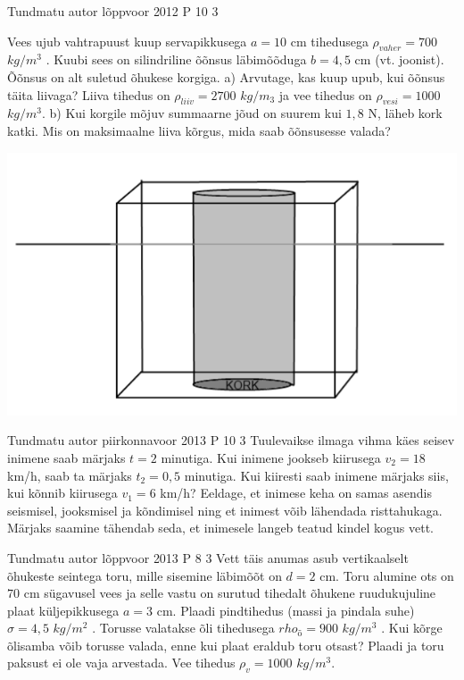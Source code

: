 \documentclass[11pt]{article}
\begin{document}
{%
{Tundmatu autor} %
{lõppvoor} %
{2012} %
{P 10} %
{3} %
{
\ifStatement
Vees ujub vahtrapuust kuup servapikkusega $a = 10$ cm tihedusega $\rho_{vaher} = 700$ $kg/m^3$ . Kuubi sees on silindriline õõnsus läbimõõduga $b = 4,5$ cm (vt. joonist). Õõnsus on alt suletud õhukese korgiga. 
a) Arvutage, kas kuup upub, kui õõnsus täita liivaga? Liiva tihedus on $\rho_{liiv} = 2700$ $kg/m_3$ ja vee tihedus on $\rho_{vesi} = 1000$ $kg/m^3$. 
b) Kui korgile mõjuv summaarne jõud on suurem kui $1,8$ N, läheb kork katki. 
Mis on maksimaalne liiva kõrgus, mida saab õõnsusesse valada?
\begin{center}
	\includegraphics[width=0.5\linewidth]{2012-v3p-10-yl.PNG}
\end{center}
\fi
}

{Tundmatu autor} %
{piirkonnavoor} %
{2013} %
{P 10} %
{3} %
{
\ifStatement
Tuulevaikse ilmaga vihma käes seisev inimene saab märjaks $t = 2$ minutiga. Kui inimene jookseb kiirusega $v_2 = 18$ km/h, saab ta märjaks $t_2 = 0,5$ minutiga. Kui kiiresti saab inimene märjaks siis, kui kõnnib kiirusega $v_1 = 6$ km/h? Eeldage, et inimese keha on samas asendis seismisel, jooksmisel ja kõndimisel ning et inimest võib lähendada risttahukaga. Märjaks saamine tähendab seda, et inimesele langeb teatud kindel kogus vett.
\fi
}

{Tundmatu autor} %
{lõppvoor} %
{2013} %
{P 8} %
{3} %
{
\ifStatement
Vett täis anumas asub vertikaalselt õhukeste seintega toru, mille sisemine läbimõõt on $d = 2$ cm. Toru alumine ots on $70$ cm sügavusel vees ja selle vastu on surutud tihedalt õhukene ruudukujuline plaat küljepikkusega $a = 3$ cm. Plaadi pindtihedus (massi ja pindala suhe) $\sigma  = 4,5$ $kg/m^2$ . Torusse valatakse õli tihedusega $rho_õ = 900$ $kg/m^3$ . Kui kõrge õlisamba võib torusse valada, enne kui plaat eraldub toru otsast? Plaadi ja toru paksust ei ole vaja arvestada. Vee tihedus $\rho_v = 1000$ $kg/m^3$. 
\fi
}

}
\end{document}
